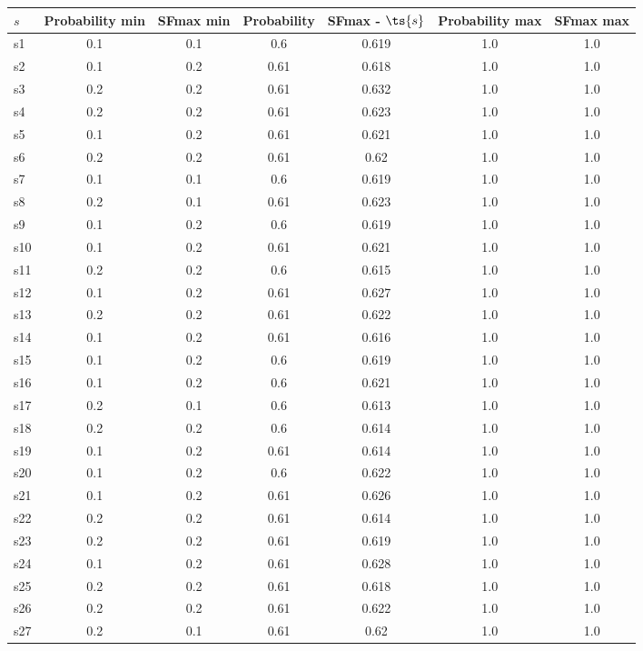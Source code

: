 \documentclass{article}
\begin{document}
\noindent\begin{tabular}{|l|c|c|c|c|c|c|}
\hline
$s$& Probability min & SFmax min & Probability & SFmax - $\ts{s}$ & Probability max & SFmax max\\
\hline
s1 &0.1 & 0.1 & 0.6 & 0.619 & 1.0 & 1.0\\
\hline
s2 &0.1 & 0.2 & 0.61 & 0.618 & 1.0 & 1.0\\
\hline
s3 &0.2 & 0.2 & 0.61 & 0.632 & 1.0 & 1.0\\
\hline
s4 &0.2 & 0.2 & 0.61 & 0.623 & 1.0 & 1.0\\
\hline
s5 &0.1 & 0.2 & 0.61 & 0.621 & 1.0 & 1.0\\
\hline
s6 &0.2 & 0.2 & 0.61 & 0.62 & 1.0 & 1.0\\
\hline
s7 &0.1 & 0.1 & 0.6 & 0.619 & 1.0 & 1.0\\
\hline
s8 &0.2 & 0.1 & 0.61 & 0.623 & 1.0 & 1.0\\
\hline
s9 &0.1 & 0.2 & 0.6 & 0.619 & 1.0 & 1.0\\
\hline
s10 &0.1 & 0.2 & 0.61 & 0.621 & 1.0 & 1.0\\
\hline
s11 &0.2 & 0.2 & 0.6 & 0.615 & 1.0 & 1.0\\
\hline
s12 &0.1 & 0.2 & 0.61 & 0.627 & 1.0 & 1.0\\
\hline
s13 &0.2 & 0.2 & 0.61 & 0.622 & 1.0 & 1.0\\
\hline
s14 &0.1 & 0.2 & 0.61 & 0.616 & 1.0 & 1.0\\
\hline
s15 &0.1 & 0.2 & 0.6 & 0.619 & 1.0 & 1.0\\
\hline
s16 &0.1 & 0.2 & 0.6 & 0.621 & 1.0 & 1.0\\
\hline
s17 &0.2 & 0.1 & 0.6 & 0.613 & 1.0 & 1.0\\
\hline
s18 &0.2 & 0.2 & 0.6 & 0.614 & 1.0 & 1.0\\
\hline
s19 &0.1 & 0.2 & 0.61 & 0.614 & 1.0 & 1.0\\
\hline
s20 &0.1 & 0.2 & 0.6 & 0.622 & 1.0 & 1.0\\
\hline
s21 &0.1 & 0.2 & 0.61 & 0.626 & 1.0 & 1.0\\
\hline
s22 &0.2 & 0.2 & 0.61 & 0.614 & 1.0 & 1.0\\
\hline
s23 &0.2 & 0.2 & 0.61 & 0.619 & 1.0 & 1.0\\
\hline
s24 &0.1 & 0.2 & 0.61 & 0.628 & 1.0 & 1.0\\
\hline
s25 &0.2 & 0.2 & 0.61 & 0.618 & 1.0 & 1.0\\
\hline
s26 &0.2 & 0.2 & 0.61 & 0.622 & 1.0 & 1.0\\
\hline
s27 &0.2 & 0.1 & 0.61 & 0.62 & 1.0 & 1.0\\

\end{tabular}
\end{document}
